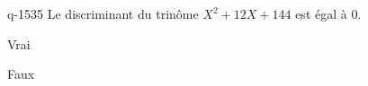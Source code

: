 \begin{truefalse}{q-1535}
Le discriminant du trinôme $X^2+12X+144$ est égal à $0$.
\item Vrai
\item* Faux
\end{truefalse}


